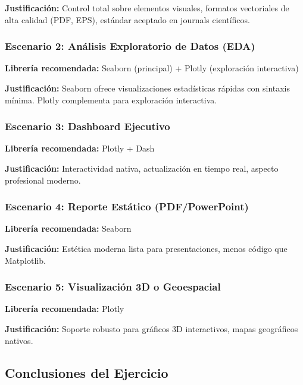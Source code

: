\documentclass[12pt]{src/formato_utem}
\begin{document}
\textbf{Justificación:} Control total sobre elementos visuales, formatos vectoriales de alta calidad (PDF, EPS), estándar aceptado en journals científicos.

\subsubsection{Escenario 2: Análisis Exploratorio de Datos (EDA)}
\textbf{Librería recomendada:} Seaborn (principal) + Plotly (exploración interactiva)

\textbf{Justificación:} Seaborn ofrece visualizaciones estadísticas rápidas con sintaxis mínima. Plotly complementa para exploración interactiva.

\subsubsection{Escenario 3: Dashboard Ejecutivo}
\textbf{Librería recomendada:} Plotly + Dash

\textbf{Justificación:} Interactividad nativa, actualización en tiempo real, aspecto profesional moderno.

\subsubsection{Escenario 4: Reporte Estático (PDF/PowerPoint)}
\textbf{Librería recomendada:} Seaborn

\textbf{Justificación:} Estética moderna lista para presentaciones, menos código que Matplotlib.

\subsubsection{Escenario 5: Visualización 3D o Geoespacial}
\textbf{Librería recomendada:} Plotly

\textbf{Justificación:} Soporte robusto para gráficos 3D interactivos, mapas geográficos nativos.

\subsection{Conclusiones del Ejercicio}
\end{document}
